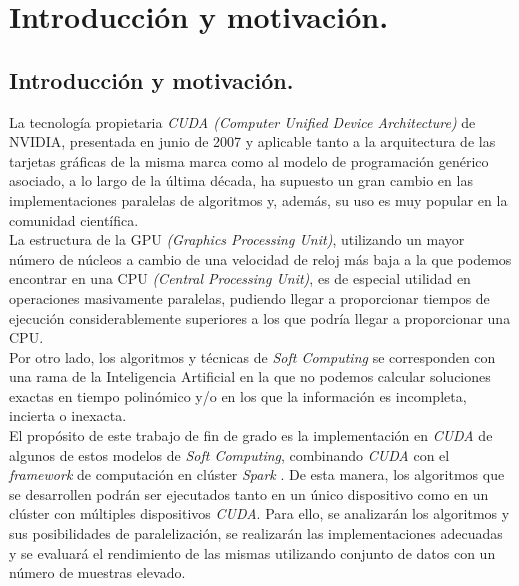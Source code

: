 \documentclass[a4paper,oneside,11pt,titlepage]{book}
\begin{document}

  
\frontmatter
\tableofcontents
\listoffigures
\listoftables

%
\mainmatter
\setlength{\parskip}{5pt}
\chapter{Introducción y motivación.}
\section{Introducción y motivación.}

La tecnología propietaria \textit{CUDA (Computer Unified Device Architecture)} \cite{cuda} de NVIDIA, presentada en junio de 2007 y aplicable tanto a la arquitectura de las tarjetas gráficas de la misma marca como al modelo de programación genérico asociado, a lo largo de la última década, ha supuesto un gran cambio en las implementaciones paralelas de algoritmos y, además, su uso es muy popular en la comunidad científica.\\

La estructura de la GPU \textit{(Graphics Processing Unit)}, utilizando un mayor número de núcleos a cambio de una velocidad de reloj más baja a la que podemos encontrar en una CPU \textit{(Central Processing Unit)}, es de especial utilidad en operaciones masivamente paralelas, pudiendo llegar a proporcionar tiempos de ejecución considerablemente superiores a los que podría llegar a proporcionar una CPU.\\

Por otro lado, los algoritmos y técnicas de \textit{Soft Computing} se corresponden con una rama de la Inteligencia Artificial en la que no podemos calcular soluciones exactas en tiempo polinómico y/o en los que la información es incompleta, incierta o inexacta.\\

El propósito de este trabajo de fin de grado es la implementación en \textit{CUDA} de algunos de estos modelos de \textit{Soft Computing}, combinando \textit{CUDA} con el \textit{framework} de computación en clúster \textit{Spark} \cite{spark}. De esta manera, los algoritmos que se desarrollen podrán ser ejecutados tanto en un único dispositivo como en un clúster con múltiples dispositivos \textit{CUDA}. Para ello, se analizarán los algoritmos y sus posibilidades de paralelización, se realizarán las implementaciones adecuadas y se evaluará el rendimiento de las mismas utilizando conjunto de datos con un número de muestras elevado.\\
\end{document}
